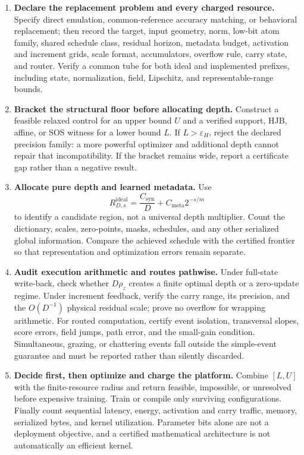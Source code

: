 \documentclass[twoside,11pt]{article}
\begin{document}
\begin{enumerate}[leftmargin=1.8em,itemsep=.62em]
\item \textbf{Declare the replacement problem and every charged resource.}  Specify direct emulation, common-reference accuracy matching, or behavioral replacement; then record the target, input geometry, norm, low-bit atom family, shared schedule class, residual horizon, metadata budget, activation and increment grids, scale format, accumulators, overflow rule, carry state, and router.  Verify a common tube for both ideal and implemented prefixes, including state, normalization, field, Lipschitz, and representable-range bounds.

\item \textbf{Bracket the structural floor before allocating depth.}  Construct a feasible relaxed control for an upper bound $U$ and a verified support, HJB, affine, or SOS witness for a lower bound $L$.  If $L>\varepsilon_H$, reject the declared precision family: a more powerful optimizer and additional depth cannot repair that incompatibility.  If the bracket remains wide, report a certificate gap rather than a negative result.

\item \textbf{Allocate pure depth and learned metadata.}  Use
\begin{equation}
 R_{D,s}^{\mathrm{ideal}}
 =\frac{C_{\mathrm{syn}}}{D}+C_{\mathrm{meta}}2^{-s/m}
 \label{eq:ideal-resource-radius-design}
\end{equation}
to identify a candidate region, not a universal depth multiplier.  Count the dictionary, scales, zero-points, masks, schedules, and any other serialized global information.  Compare the achieved schedule with the certified frontier so that representation and optimization errors remain separate.

\item \textbf{Audit execution arithmetic and routes pathwise.}  Under full-state write-back, check whether $D\rho_z$ creates a finite optimal depth or a zero-update regime.  Under increment feedback, verify the carry range, its precision, and the $O(D^{-1})$ physical residual scale; prove no overflow for wrapping arithmetic.  For routed computation, certify event isolation, transversal slopes, score errors, field jumps, path error, and the small-gain condition.  Simultaneous, grazing, or chattering events fall outside the simple-event guarantee and must be reported rather than silently discarded.

\item \textbf{Decide first, then optimize and charge the platform.}  Combine $[L,U]$ with the finite-resource radius and return feasible, impossible, or unresolved before expensive training.  Train or compile only surviving configurations.  Finally count sequential latency, energy, activation and carry traffic, memory, serialized bytes, and kernel utilization.  Parameter bits alone are not a deployment objective, and a certified mathematical architecture is not automatically an efficient kernel.
\end{enumerate}
\end{document}
